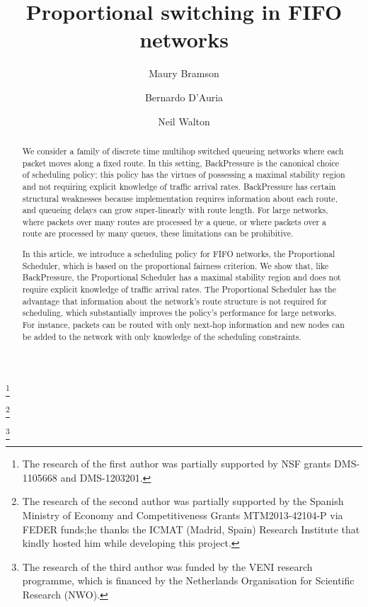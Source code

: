\documentclass{amsart}
\begin{document}
\title[Proportional Switching]{Proportional switching in FIFO networks}

\author{Maury Bramson}
\address{School of Mathematics, University of Minnesota, 206 Church St. SE, MN 55455, USA.}
\thanks{The research of the first author was partially supported by NSF grants DMS-1105668 and DMS-1203201.}
\author{Bernardo D'Auria}
\address{Departmento de Estad\'istica, Universidad Carlos III de Madrid, Calle Madrid 126, 28903 Getafe, Madrid, Spain.}
\thanks{The research of the second author was partially supported by the Spanish Ministry of Economy and Competitiveness Grants MTM2013-42104-P via FEDER funds;he  thanks the ICMAT (Madrid, Spain) Research Institute that kindly hosted him while developing this project.}
\author{Neil Walton}
\address{Korteweg-de Vries Institute for Mathematics, University of Amsterdam, Science Park 904, 1098 XH Amsterdam, NL.}
\thanks{The research of the third author was funded by the VENI research programme, which is financed by the
Netherlands Organisation for Scientific Research (NWO).}


\date{}

\begin{abstract}

We consider a family of discrete time multihop switched queueing networks where each packet moves along a fixed route. In this setting, BackPressure is the canonical choice of scheduling policy; this policy has the virtues of possessing a maximal stability region and not requiring explicit knowledge of traffic arrival rates.  BackPressure has certain structural weaknesses because implementation requires information about each route, and queueing delays can grow super-linearly with route length. For large networks, where 
packets over
many routes are processed by a queue, or where packets over a route are processed by many queues, these limitations can be prohibitive. 

In this article, we introduce a scheduling policy for FIFO networks, the Proportional Scheduler, which is based on the proportional fairness criterion. We show that, like BackPressure, the Proportional Scheduler has a maximal stability region and does not require explicit knowledge of traffic arrival rates.
The Proportional Scheduler has the advantage that information about the network\rq{}s route structure  is not required for scheduling, 
which substantially improves the policy's performance for large networks.
For instance, packets can be routed with only next-hop information and new nodes can be added to the network with only knowledge of the scheduling constraints. 

\end{abstract}
\end{document}
